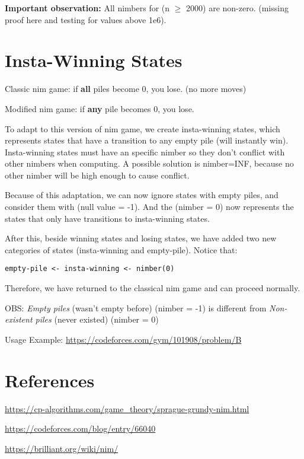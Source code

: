 \textbf{Important observation:} All nimbers for (n $\ge$ 2000) are non-zero.
(missing proof here and testing for values above 1e6).

\section{Insta-Winning States}

Classic nim game: if \textbf{all} piles become 0, you lose. (no more moves)

Modified nim game: if \textbf{any} pile becomes 0, you lose.

To adapt to this version of nim game, we create insta-winning states,
which represents states that have a transition to any empty pile (will instantly win).
Insta-winning states must have an specific nimber so they don't conflict with other nimbers when computing.
A possible solution is nimber=INF, because no other nimber will be high enough to cause conflict. 

Because of this adaptation, we can now ignore states with empty piles, and consider them with (null value = -1).
And the (nimber = 0) now represents the states that only have transitions to insta-winning states.

After this, beside winning states and losing states, we have added two new categories of states
(insta-winning and empty-pile). Notice that:

\begin{lstlisting}[language=raw]
empty-pile <- insta-winning <- nimber(0)
\end{lstlisting}

Therefore, we have returned to the classical nim game and can proceed normally.

OBS: \textit{Empty piles} (wasn't empty before) (nimber = -1) is different from \textit{Non-existent piles} (never existed) (nimber = 0)

Usage Example: \url{https://codeforces.com/gym/101908/problem/B}

\section{References}

\url{https://cp-algorithms.com/game_theory/sprague-grundy-nim.html}

\url{https://codeforces.com/blog/entry/66040}

\url{https://brilliant.org/wiki/nim/}